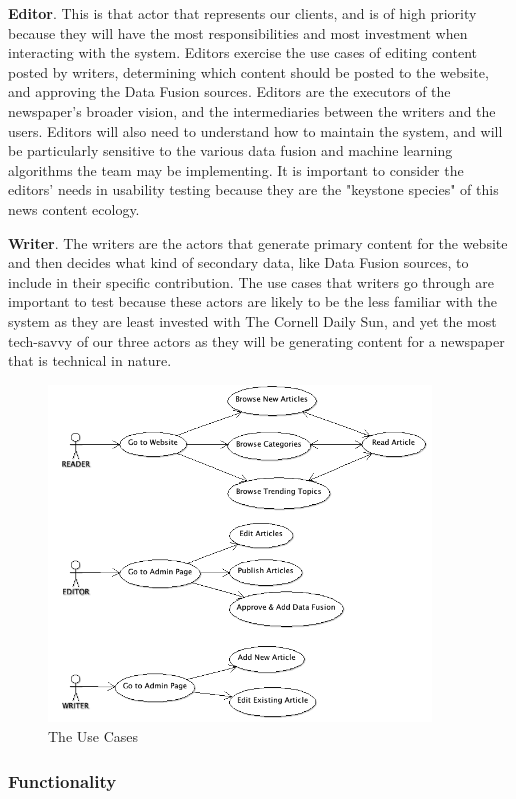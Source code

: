 \documentclass[11pt]{article} %
\begin{document}
\textbf{Editor}. This is that actor that represents our clients, and is of high priority because they will have the most responsibilities and most investment when interacting with the system. Editors exercise the use cases of editing content posted by writers, determining which content should be posted to the website, and approving the Data Fusion sources. Editors are the executors of the newspaper’s broader vision, and the intermediaries between the writers and the users. Editors will also need to understand how to maintain the system, and will be particularly sensitive to the various data fusion and machine learning algorithms the team may be implementing. It is important to consider the editors' needs in usability testing because they are the "keystone species" of this news content ecology.

\textbf{Writer}. The writers are the actors that generate primary content for the website and then decides what kind of secondary data, like Data Fusion sources, to include in their specific contribution. The use cases that writers go through are important to test because these actors are likely to be the less familiar with the system as they are least invested with The Cornell Daily Sun, and yet the most tech-savvy of our three actors as they will be generating content for a newspaper that is technical in nature.


\begin{figure}[h]
\begin{center}
\includegraphics[width=4in]{images/use_case}
\end{center}
\caption{The Use Cases}
\end{figure}
                   
\subsubsection{Functionality}
                   
\end{document}
